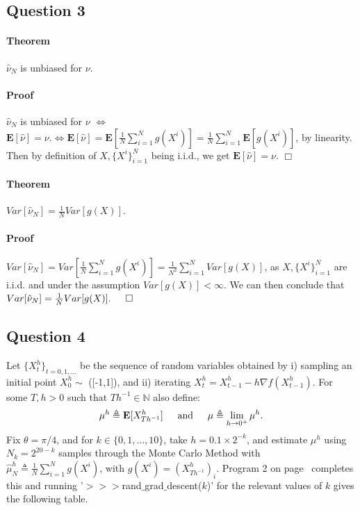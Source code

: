 \documentclass{article}
\begin{document}
\subsection{Question 3}
\paragraph{Theorem}
$\hat{\nu}_N$ is unbiased for $\nu$.
\paragraph{Proof}
$\hat{\nu}_N$ is unbiased for $\nu$ $\iff$ $\textbf{E}[\hat{\nu}]=\nu. \iff \textbf{E}[\hat{\nu}]=\textbf{E}[\frac{1}{N} \sum_{i=1}^N g(X^i)]=\frac{1}{N} \sum_{i=1}^N \textbf{E}[g(X^i)]$, by linearity. Then by definition of $X, \{X^i\}_{i=1}^N$ being i.i.d., we get $\textbf{E}[\hat{\nu}]=\nu.$ \indent{} $\Box$

\paragraph{Theorem} $Var[\hat{\nu}_N]=\frac{1}{N} Var[g(X)]$.
\paragraph{Proof}
$Var[\hat{\nu}_N]= Var[\frac{1}{N} \sum_{i=1}^N g(X^i)]=\frac{1}{N^2}\sum_{i=1}^N Var[g(X)]$, as $X, \{X^i\}_{i=1}^N$ are i.i.d. and under the assumption $Var[g(X)]<\infty$. We can then conclude that $Var[\hat{\nu}_N]=\frac{1}{N} Var[g(X)]. \indent{} \Box$

\subsection{Question 4}
Let $\{X_t^h\}_{t=0,1,\dots}$ be the sequence of random variables obtained by i) sampling an initial point $X_0^h \sim$ ([-1,1]), and ii) iterating $X_t^h=X_{t-1}^h-h \nabla f(X_{t-1}^h)$. For some $T, h>0$ such that $Th^{-1} \in \mathbb{N}$ also define: 
\begin{equation}
\mu^h\triangleq \textbf{E}[X_{Th^{-1}}^h] \indent{} \text{and} \indent{} \mu \triangleq \lim_{h\to 0^+} \mu^h. 
\end{equation}
Fix $\theta=\pi/4$, and for $k \in \{0,1,\dots,10\}$, take $h=0.1 \times 2^{-k}$, and estimate $\mu^h$ using $N_k=2^{20-k}$ samples through the Monte Carlo Method with $\hat{\mu}_N^h \triangleq \frac{1}{N} \sum_{i=1}^N g(X^i)$, with $g(X^i)=(X_{Th^{-1}}^h)_i$. Program 2 on page~\pageref{subsec:Program 2} completes this and running '$>>>$rand$\_$grad$\_$descent($k$)' for the relevant values of $k$ gives the following table.
\end{document}
